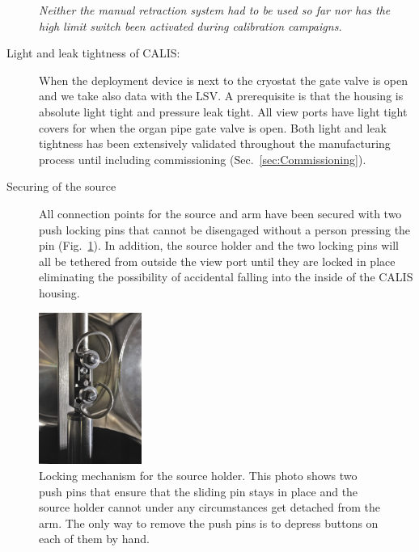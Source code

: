 \begin{description}
\textit{Neither the manual retraction system had to be used so far nor has the high limit switch been activated during calibration campaigns.}
    
\item[Light and leak tightness of CALIS:]
When the deployment device is next to the cryostat the gate valve is open and we take also data with the LSV. A prerequisite is that the housing is absolute light tight and pressure leak tight. All view ports have light tight covers for when the organ pipe gate valve is open. Both light and leak tightness has been extensively validated throughout the manufacturing process until including commissioning (Sec.~\ref{sec:Commissioning}).

\item[Securing of the source]
All connection points for the source and arm have been secured with two push locking pins that cannot be disengaged without a person pressing the pin (Fig.~\ref{fig:sourceHolder_locking}). In addition, the source holder and the two locking pins will all be tethered from outside the view port until they are locked in place eliminating the possibility of accidental falling into the inside of the CALIS housing.

\end{description}
	

\begin{figure}[htbp]
 \centering
 \includegraphics[width=0.3\textwidth]{Figures/sourceHolder_locking}
 \caption{Locking mechanism for the source holder. This photo shows two push pins that ensure that the sliding pin stays in place and the source holder cannot under any circumstances get detached from the arm.  The only way to remove the push pins is to depress buttons on each of them by hand.}
 \label{fig:sourceHolder_locking}
\end{figure}

